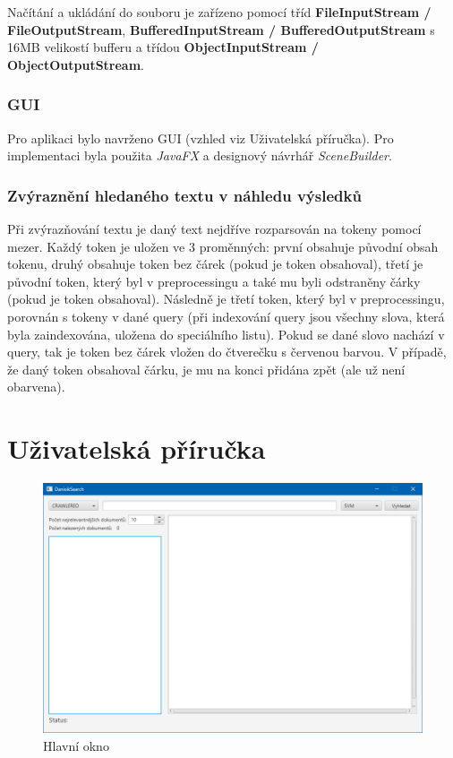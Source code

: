 \documentclass[12pt, a4paper]{article}
\begin{document}
Načítání a ukládání do souboru je zařízeno pomocí tříd \textbf{FileInputStream / FileOutputStream}, \textbf{BufferedInputStream / BufferedOutputStream} s 16MB velikostí bufferu a třídou \textbf{ObjectInputStream / ObjectOutputStream}.
\subsubsection{GUI}
Pro aplikaci bylo navrženo GUI (vzhled viz Uživatelská příručka). Pro implementaci byla použita \textit{JavaFX} a designový návrhář \textit{SceneBuilder}.
\subsubsection{Zvýraznění hledaného textu v náhledu výsledků}
Při zvýrazňování textu je daný text nejdříve rozparsován na tokeny pomocí mezer. Každý token je uložen ve 3 proměnných: první obsahuje původní obsah tokenu, druhý obsahuje token bez čárek (pokud je token obsahoval), třetí je původní token, který byl v preprocessingu a také mu byli odstraněny čárky (pokud je token obsahoval). Následně je třetí token, který byl v preprocessingu, porovnán s tokeny v dané query (při indexování query jsou všechny slova, která byla zaindexována, uložena do speciálního listu). Pokud se dané slovo nachází v query, tak je token bez čárek vložen do čtverečku s červenou barvou. V případě, že daný token obsahoval čárku, je mu na konci přidána zpět (ale už není obarvena).

\newpage

\section{Uživatelská příručka}

\begin{figure}[h]
	\centering
	\includegraphics[width=15cm]{img/main.png}
	\caption{Hlavní okno}
	\label{fig:main}
\end{figure}
\end{document}
